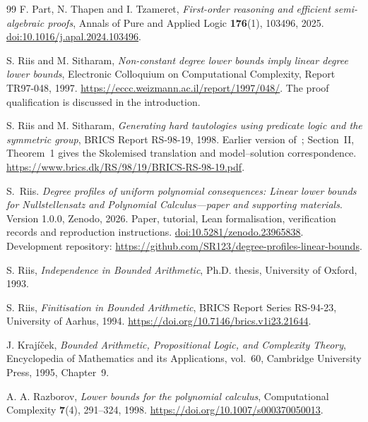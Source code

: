 \documentclass[11pt,a4paper]{article}
\theoremstyle{definition}\newtheorem{definition}[theorem]{Definition}
\theoremstyle{remark}\newtheorem{remark}[theorem]{Remark}
\begin{document}
\begin{thebibliography}{99}
F. Part, N. Thapen and I. Tzameret, \emph{First-order reasoning and
efficient semi-algebraic proofs}, Annals of Pure and Applied Logic
\textbf{176}(1), 103496, 2025.
\href{https://doi.org/10.1016/j.apal.2024.103496}{doi:10.1016/j.apal.2024.103496}.

S. Riis and M. Sitharam, \emph{Non-constant degree lower bounds imply
linear degree lower bounds}, Electronic Colloquium on Computational
Complexity, Report TR97-048, 1997.
\url{https://eccc.weizmann.ac.il/report/1997/048/}.
The proof qualification is discussed in the introduction.

S. Riis and M. Sitharam, \emph{Generating hard tautologies using predicate
logic and the symmetric group}, BRICS Report RS-98-19, 1998.
Earlier version of~\cite{RiisSitharamTautologies}; Section~II,
Theorem~1 gives the Skolemised translation and model--solution correspondence.
\url{https://www.brics.dk/RS/98/19/BRICS-RS-98-19.pdf}.

S.~Riis.
\emph{Degree profiles of uniform polynomial consequences: Linear lower
bounds for Nullstellensatz and Polynomial Calculus---paper and supporting materials}.
Version 1.0.0, Zenodo, 2026. Paper, tutorial, Lean formalisation,
verification records and reproduction instructions.
\href{https://doi.org/10.5281/zenodo.23965838}{doi:10.5281/zenodo.23965838}.
Development repository:
\url{https://github.com/SR123/degree-profiles-linear-bounds}.

S. Riis, \emph{Independence in Bounded Arithmetic},
Ph.D. thesis, University of Oxford, 1993.

S. Riis, \emph{Finitisation in Bounded Arithmetic},
BRICS Report Series RS-94-23, University of Aarhus, 1994.
\url{https://doi.org/10.7146/brics.v1i23.21644}.

J. Kraj\'{i}\v{c}ek, \emph{Bounded Arithmetic, Propositional Logic,
and Complexity Theory}, Encyclopedia of Mathematics and its Applications,
vol.~60, Cambridge University Press, 1995, Chapter~9.

A. A. Razborov, \emph{Lower bounds for the polynomial calculus},
Computational Complexity \textbf{7}(4), 291--324, 1998.
\url{https://doi.org/10.1007/s000370050013}.

\end{thebibliography}
\end{document}

